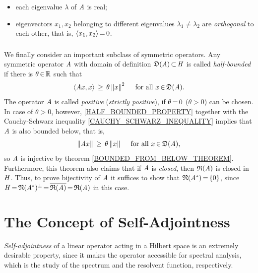 \documentclass[11pt,twoside]{article}
\begin{document}
\begin{itemize}[leftmargin=12pt]
\item[1.]
each eigenvalue $\lambda$ of $\mathit{A}$ is real;

\item[2.]
eigenvectors $x_1,x_2$
belonging to different eigenvalues $\lambda_1 \neq \lambda_2$
are \textit{orthogonal} to each other,
that is,
$\langle x_1,x_2 \rangle {\,=\,} 0$.
\end{itemize}

\subsubsection*{} %
We finally consider an important subclass of symmetric operators.
Any symmetric operator $\mathit{A}$
with domain of definition $\mathfrak{D}(\mathit{A}) {\,\subset\,} \mathit{H}$
is called \textit{half-bounded}
if there is $\theta {\,\in\,} {\mathbb{R}}$ such that
\begin{equation}\label{HALF_BOUNDED_PROPERTY}
\langle \mathit{A} x,x \rangle \, \geq \, \theta \left\lVert x \right\rVert^2
\quad \mbox{ for all } x {\,\in\,} \mathfrak{D}(\mathit{A}).
\end{equation}
The operator $\mathit{A}$ is called \textit{positive} (\textit{strictly positive}),
if $\theta {\,=\,} 0$ ($\theta > 0$) can be chosen.
In case of $\theta > 0$,
however,
\eqref{HALF_BOUNDED_PROPERTY} together with the Cauchy-Schwarz inequality
\eqref{CAUCHY_SCHWARZ_INEQUALITY} implies
that $\mathit{A}$ is also bounded below,
that is,
\begin{equation}\label{BOUNDED_FROM_BELOW_PROPERTY}
\left\lVert \mathit{A} x \right\rVert \, \geq \, \theta \left\lVert x \right\rVert \quad \mbox{ for all } x {\,\in\,} \mathfrak{D}(\mathit{A}),
\end{equation}
so $\mathit{A}$ is injective by theorem \ref{BOUNDED_FROM_BELOW_THEOREM}.
Furthermore,
this theorem also claims
that if $\mathit{A}$ is \textit{closed}, 
then $\mathfrak{R}(\mathit{A})$ is closed in $\mathit{H}$.
Thus, to prove bijectivity of $\mathit{A}$ it suffices to show that 
$\mathfrak{N}(\mathit{A}^*) {\,=\,} \{0\}$,
since 
$\mathit{H} {\,=\,} \mathfrak{N}(\mathit{A}^*)^{\bot} {\,=\,} \overline{\mathfrak{R}(\mathit{A})} {\,=\,} \mathfrak{R}(\mathit{A})$
in this case.

\section{The Concept of Self-Adjointness}
\textit{Self-adjointness} of a linear operator
acting in a Hilbert space is an extremely desirable property, 
since it makes the operator accessible for spectral analysis,
which is the study of the spectrum and the resolvent function,
respectively.
\end{document}
